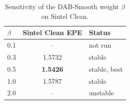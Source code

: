 \begin{table}[t]
\centering
\caption{Sensitivity of the DAB-Smooth weight $\beta$ on Sintel Clean.}
\label{tab:beta_sensitivity}
\begin{tabular}{lcl}
\toprule
$\beta$ & Sintel Clean EPE & Status \\
\midrule
0.1 & -- & not run \\
0.3 & 1.5732 & stable \\
0.5 & \textbf{1.5426} & stable, best \\
1.0 & 1.5787 & stable \\
2.0 & -- & unstable \\
\bottomrule
\end{tabular}
\end{table}
